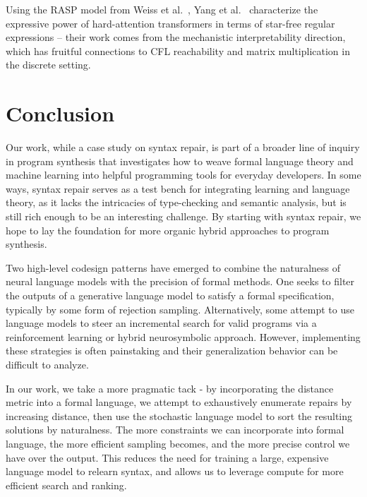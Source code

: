 \documentclass[sigplan,review,acmsmall,nonacm,screen,anonymous]{acmart}\settopmatter{printfolios=false,printccs=false,printacmref=false}
\begin{document}
Using the RASP model from Weiss et al.~\cite{weiss2021thinking}, Yang et al.~\cite{yang2024masked} characterize the expressive power of hard-attention transformers in terms of star-free regular expressions -- their work comes from the mechanistic interpretability direction, which has fruitful connections to CFL reachability and matrix multiplication in the discrete setting.

\clearpage\section{Conclusion}\label{sec:conclusion}

Our work, while a case study on syntax repair, is part of a broader line of inquiry in program synthesis that investigates how to weave formal language theory and machine learning into helpful programming tools for everyday developers. In some ways, syntax repair serves as a test bench for integrating learning and language theory, as it lacks the intricacies of type-checking and semantic analysis, but is still rich enough to be an interesting challenge. By starting with syntax repair, we hope to lay the foundation for more organic hybrid approaches to program synthesis.

Two high-level codesign patterns have emerged to combine the naturalness of neural language models with the precision of formal methods. One seeks to filter the outputs of a generative language model to satisfy a formal specification, typically by some form of rejection sampling. Alternatively, some attempt to use language models to steer an incremental search for valid programs via a reinforcement learning or hybrid neurosymbolic approach. However, implementing these strategies is often painstaking and their generalization behavior can be difficult to analyze.

In our work, we take a more pragmatic tack - by incorporating the distance metric into a formal language, we attempt to exhaustively enumerate repairs by increasing distance, then use the stochastic language model to sort the resulting solutions by naturalness. The more constraints we can incorporate into formal language, the more efficient sampling becomes, and the more precise control we have over the output. This reduces the need for training a large, expensive language model to relearn syntax, and allows us to leverage compute for more efficient search and ranking.
\end{document}
